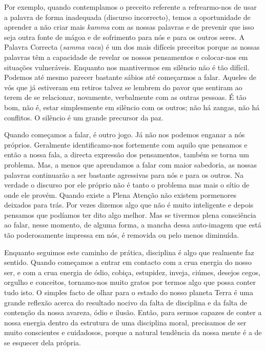 Por exemplo, quando contemplamos o preceito referente a refrearmo-nos de
usar a palavra de forma inadequada (discurso incorrecto), temos a
oportunidade de aprender a não criar mais \emph{kamma} com as nossas
palavras e de prevenir que isso seja outra fonte de mágoa e de
sofrimento para nós e para os outros seres. A Palavra Correcta
(\emph{samma vaca}) é um dos mais difíceis preceitos porque as nossas
palavras têm a capacidade de revelar os nossos pensamentos e colocar-nos
em situações vulneráveis. Enquanto nos mantivermos em silêncio não é tão
difícil. Podemos até mesmo parecer bastante sábios até começarmos a
falar. Aqueles de vós que já estiveram em retiros talvez se lembrem do
pavor que sentiram ao terem de se relacionar, novamente, verbalmente com
as outras pessoas. É tão bom, não é, estar simplesmente em silêncio com
os outros; não há zangas, não há conflitos. O silêncio é um grande
precursor da paz.

Quando começamos a falar, é outro jogo. Já não nos podemos enganar a nós
próprios. Geralmente identificamo-nos fortemente com aquilo que pensamos
e então a nossa fala, a directa expressão dos pensamentos, também se
torna um problema. Mas, a menos que aprendamos a falar com maior
sabedoria, as nossas palavras continuarão a ser bastante agressivas para
nós e para os outros. Na verdade o discurso por ele próprio não é tanto
o problema mas mais o sítio de onde ele provém. Quando existe a Plena
Atenção não existem pormenores deixados para trás. Por vezes dizemos
algo que não é muito inteligente e depois pensamos que podíamos ter dito
algo melhor. Mas se tivermos plena consciência ao falar, nesse momento,
de alguma forma, a mancha dessa auto-imagem que está tão poderosamente
impressa em nós, é removida ou pelo menos diminuída.

Enquanto seguimos este caminho de prática, disciplina é algo que
realmente faz sentido. Quando começamos a entrar em contacto com a crua
energia do nosso ser, e com a crua energia de ódio, cobiça, estupidez,
inveja, ciúmes, desejos cegos, orgulho e conceitos, tornamo-nos muito
gratos por termos algo que possa conter tudo isto. O simples facto de
olhar para o estado do nosso planeta Terra é uma grande reflexão acerca
do resultado nocivo da falta de disciplina e da falta de contenção da
nossa avareza, ódio e ilusão. Então, para sermos capazes de conter a
nossa energia dentro da estrutura de uma disciplina moral, precisamos de
ser muito conscientes e cuidadosos, porque a natural tendência da nossa
mente é a de se esquecer dela própria.

